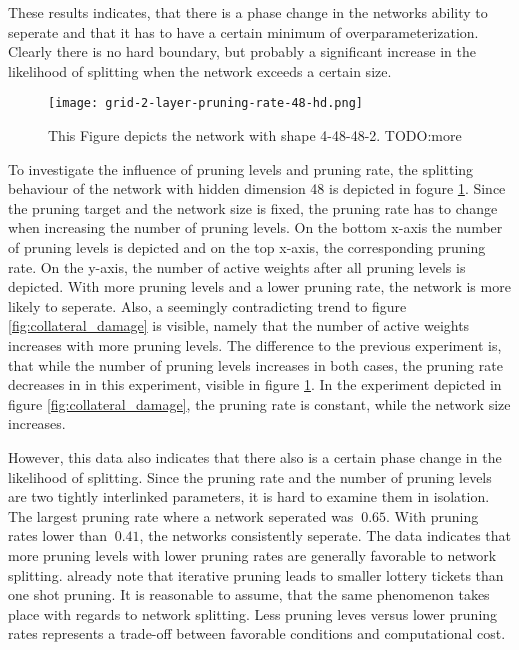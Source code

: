 These results indicates, that there is a phase change in the networks ability to seperate and that it has to have a certain minimum of overparameterization.
Clearly there is no hard boundary, but probably a significant increase in the likelihood of splitting when the network exceeds a certain size.

\begin{figure}[ht]
    \centering
    \texttt{[image: grid-2-layer-pruning-rate-48-hd.png]}
    \caption{This Figure depicts the network with shape 4-48-48-2.
    TODO:more }
    \label{fig:grid-2}
\end{figure}

To investigate the influence of pruning levels and pruning rate, the splitting behaviour of the network with hidden dimension 48 is depicted in fogure \ref{fig:grid-2}.
Since the pruning target and the network size is fixed, the pruning rate has to change when increasing the number of pruning levels.
On the bottom x-axis the number of pruning levels is depicted and on the top x-axis, the corresponding pruning rate.
On the y-axis, the number of active weights after all pruning levels is depicted.
With more pruning levels and a lower pruning rate, the network is more likely to seperate.
Also, a seemingly contradicting trend to figure \ref{fig:collateral_damage} is visible, namely that the number of active weights increases with more pruning levels.
The difference to the previous experiment is, that while the number of pruning levels increases in both cases, the pruning rate decreases in in this experiment, visible in figure \ref{fig:grid-2}. In the experiment depicted in figure \ref{fig:collateral_damage}, the pruning rate is constant, while the network size increases.

However, this data also indicates that there also is a certain phase change in the likelihood of splitting.
Since the pruning rate and the number of pruning levels are two tightly interlinked parameters, it is hard to examine them in isolation.
The largest pruning rate where a network seperated was $~0.65$. 
With pruning rates lower than $~0.41$, the networks consistently seperate.
The data indicates that more pruning levels with lower pruning rates are generally favorable to network splitting.
\textcite{DBLP:conf/iclr/FrankleC19} already note that iterative pruning leads to smaller lottery tickets than one shot pruning.
It is reasonable to assume, that the same phenomenon takes place with regards to network splitting.
Less pruning leves versus lower pruning rates represents a trade-off between favorable conditions and computational cost.


